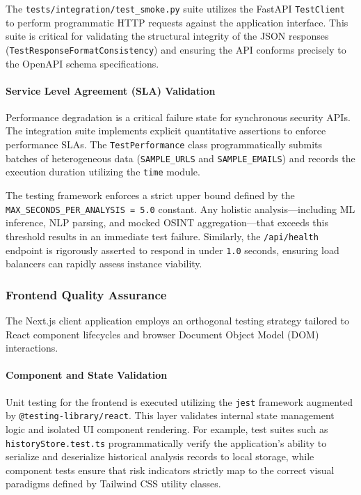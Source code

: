 The \texttt{tests/integration/test\_smoke.py} suite utilizes the FastAPI
\texttt{TestClient} to perform programmatic HTTP requests against the
application interface. This suite is critical for validating the
structural integrity of the JSON responses
(\texttt{TestResponseFormatConsistency}) and ensuring the API conforms
precisely to the OpenAPI schema specifications.

\paragraph{Service Level Agreement (SLA)
Validation}\label{service-level-agreement-sla-validation}

Performance degradation is a critical failure state for synchronous
security APIs. The integration suite implements explicit quantitative
assertions to enforce performance SLAs. The \texttt{TestPerformance}
class programmatically submits batches of heterogeneous data
(\texttt{SAMPLE\_URLS} and \texttt{SAMPLE\_EMAILS}) and records the
execution duration utilizing the \texttt{time} module.

The testing framework enforces a strict upper bound defined by the
\texttt{MAX\_SECONDS\_PER\_ANALYSIS\ =\ 5.0} constant. Any holistic
analysis---including ML inference, NLP parsing, and mocked OSINT
aggregation---that exceeds this threshold results in an immediate test
failure. Similarly, the \texttt{/api/health} endpoint is rigorously
asserted to respond in under \texttt{1.0} seconds, ensuring load
balancers can rapidly assess instance viability.

\subsubsection{Frontend Quality
Assurance}\label{frontend-quality-assurance}

The Next.js client application employs an orthogonal testing strategy
tailored to React component lifecycles and browser Document Object Model
(DOM) interactions.

\paragraph{Component and State
Validation}\label{component-and-state-validation}

Unit testing for the frontend is executed utilizing the \texttt{jest}
framework augmented by \texttt{@testing-library/react}. This layer
validates internal state management logic and isolated UI component
rendering. For example, test suites such as
\texttt{historyStore.test.ts} programmatically verify the application's
ability to serialize and deserialize historical analysis records to
local storage, while component tests ensure that risk indicators
strictly map to the correct visual paradigms defined by Tailwind CSS
utility classes.

